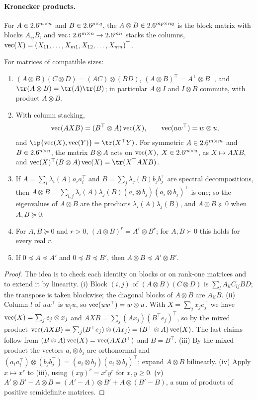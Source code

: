 \begin{refsection}
\paragraph{Kronecker products.} For $A\in2.6^{m\times n}$ and $B\in2.6^{p\times q}$, the  $A\otimes B\in2.6^{mp\times nq}$ is the block matrix with blocks $A_{ij}B$, and $\operatorname{vec}\colon2.6^{m\times n}\to2.6^{mn}$ stacks the columns, $\operatorname{vec}(X)=(X_{11},\dots,X_{m1},X_{12},\dots,X_{mn})^\top$.

\begin{lemma}\label{lem:toolkit:kron}
For matrices of compatible sizes:
\begin{enumerate}
\item $(A\otimes B)(C\otimes D)=(AC)\otimes(BD)$, $(A\otimes B)^\top=A^\top\otimes B^\top$, and $\tr(A\otimes B)=\tr(A)\tr(B)$; in particular $A\otimes I$ and $I\otimes B$ commute, with product $A\otimes B$.
\item With column stacking,
\[
  \operatorname{vec}(AXB)=(B^\top\otimes A)\operatorname{vec}(X),\qquad\operatorname{vec}(uw^\top)=w\otimes u,
\]
and $\ip{\vect(X),\vect(Y)}=\tr(X^\top Y)$. For symmetric $A\in2.6^{m\times m}$ and $B\in2.6^{n\times n}$, the matrix $B\otimes A$ acts on $\operatorname{vec}(X)$, $X\in2.6^{m\times n}$, as $X\mapsto AXB$, and $\vect(X)^\top(B\otimes A)\vect(X)=\tr(X^\top AXB)$.
\item If $A=\sum_i\lambda_i(A)a_ia_i^\top$ and $B=\sum_j\lambda_j(B)b_jb_j^\top$ are spectral decompositions, then $A\otimes B=\sum_{i,j}\lambda_i(A)\lambda_j(B)(a_i\otimes b_j)(a_i\otimes b_j)^\top$ is one; so the eigenvalues of $A\otimes B$ are the products $\lambda_i(A)\lambda_j(B)$, and $A\otimes B\succeq0$ when $A,B\succeq0$.
\item For $A,B\succeq0$ and $r>0$, $(A\otimes B)^r=A^r\otimes B^r$; for $A,B\succ0$ this holds for every real $r$.
\item If $0\preceq A\preceq A'$ and $0\preceq B\preceq B'$, then $A\otimes B\preceq A'\otimes B'$.
\end{enumerate}
\end{lemma}

\begin{proof}
The idea is to check each identity on blocks or on rank-one matrices and to extend it by linearity. (i) Block $(i,j)$ of $(A\otimes B)(C\otimes D)$ is $\sum_lA_{il}C_{lj}BD$; the transpose is taken blockwise; the diagonal blocks of $A\otimes B$ are $A_{ii}B$. (ii) Column $l$ of $uw^\top$ is $w_lu$, so $\operatorname{vec}(uw^\top)=w\otimes u$. With $X=\sum_jx_je_j^\top$ we have $\operatorname{vec}(X)=\sum_je_j\otimes x_j$ and $AXB=\sum_j(Ax_j)(B^\top e_j)^\top$, so by the mixed product $\operatorname{vec}(AXB)=\sum_j(B^\top e_j)\otimes(Ax_j)=(B^\top\otimes A)\operatorname{vec}(X)$. The last claims follow from $(B\otimes A)\operatorname{vec}(X)=\operatorname{vec}(AXB^\top)$ and $B=B^\top$. (iii) By the mixed product the vectors $a_i\otimes b_j$ are orthonormal and $(a_ia_i^\top)\otimes(b_jb_j^\top)=(a_i\otimes b_j)(a_i\otimes b_j)^\top$; expand $A\otimes B$ bilinearly. (iv) Apply $x\mapsto x^r$ to (iii), using $(xy)^r=x^ry^r$ for $x,y\ge0$. (v) $A'\otimes B'-A\otimes B=(A'-A)\otimes B'+A\otimes(B'-B)$, a sum of products of positive semidefinite matrices.
\end{proof}


\end{refsection}
